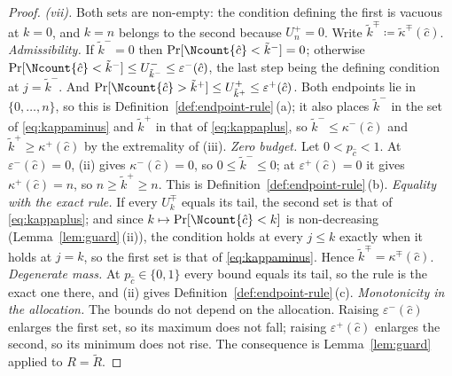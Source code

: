 \begin{proof}
\emph{(vii).} Both sets are non-empty: the condition defining the first is
vacuous at $k=0$, and $k=n$ belongs to the second because $U^{+}_n=0$. Write
$\tilde k^{\mp}\coloneqq\tilde\kappa^{\mp}(\hat c)$.
\emph{Admissibility.} If $\tilde k^{-}=0$ then
$\Pr[\Ncount{\hat c}<\tilde k^{-}]=0$; otherwise
$\Pr[\Ncount{\hat c}<\tilde k^{-}]\le U^{-}_{\tilde k^{-}}
\le\varepsilon^{-}(\hat c)$, the last step being the defining condition at
$j=\tilde k^{-}$. And
$\Pr[\Ncount{\hat c}>\tilde k^{+}]\le U^{+}_{\tilde k^{+}}
\le\varepsilon^{+}(\hat c)$. Both endpoints lie in $\{0,\dots,n\}$, so this
is Definition~\ref{def:endpoint-rule}\,(a); it also places $\tilde k^{-}$
in the set of \eqref{eq:kappaminus} and $\tilde k^{+}$ in that of
\eqref{eq:kappaplus}, so $\tilde k^{-}\le\kappa^{-}(\hat c)$ and
$\tilde k^{+}\ge\kappa^{+}(\hat c)$ by the extremality of (iii).
\emph{Zero budget.} Let $0<p_{\hat c}<1$. At $\varepsilon^{-}(\hat c)=0$,
(ii) gives $\kappa^{-}(\hat c)=0$, so $0\le\tilde k^{-}\le0$; at
$\varepsilon^{+}(\hat c)=0$ it gives $\kappa^{+}(\hat c)=n$, so
$n\ge\tilde k^{+}\ge n$. This is Definition~\ref{def:endpoint-rule}\,(b).
\emph{Equality with the exact rule.} If every $U^{\mp}_k$ equals its tail,
the second set is that of \eqref{eq:kappaplus}; and since
$k\mapsto\Pr[\Ncount{\hat c}<k]$ is non-decreasing
(Lemma~\ref{lem:guard}\,(ii)), the condition holds at every $j\le k$
exactly when it holds at $j=k$, so the first set is that of
\eqref{eq:kappaminus}. Hence $\tilde k^{\mp}=\kappa^{\mp}(\hat c)$.
\emph{Degenerate mass.} At $p_{\hat c}\in\{0,1\}$ every bound equals its
tail, so the rule is the exact one there, and (ii) gives
Definition~\ref{def:endpoint-rule}\,(c).
\emph{Monotonicity in the allocation.} The bounds do not depend on the
allocation. Raising $\varepsilon^{-}(\hat c)$ enlarges the first set, so its
maximum does not fall; raising $\varepsilon^{+}(\hat c)$ enlarges the second,
so its minimum does not rise. The consequence is Lemma~\ref{lem:guard}
applied to $R=\tilde R$.
\end{proof}
